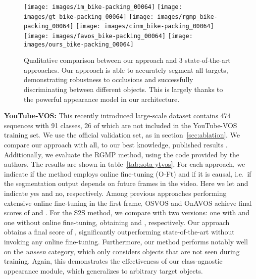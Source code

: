 \documentclass[10pt,twocolumn,letterpaper]{article}
\newcommand{\parsection}[1]{\noindent\textbf{#1:} }
\begin{document}
\begin{figure*}[!t]
  \texttt{[image: images/im\_bike-packing\_00064]}
  \texttt{[image: images/gt\_bike-packing\_00064]}
  \texttt{[image: images/rgmp\_bike-packing\_00064]}
  \texttt{[image: images/cinm\_bike-packing\_00064]}
  \texttt{[image: images/favos\_bike-packing\_00064]}
  \texttt{[image: images/ours\_bike-packing\_00064]}

  \caption{Qualitative comparison between our approach and 3 state-of-the-art approaches. Our approach is able to accurately segment all targets, demonstrating robustness to occlusions and successfully discriminating between different objects. This is largely thanks to the powerful appearance model in our architecture.}
  \vspace{-.22cm}

  \label{fig:qualitative-comparison}
\end{figure*}

\parsection{YouTube-VOS}
This recently introduced large-scale dataset contains 474 sequences with 91 classes, 26 of which are not included in the YouTube-VOS training set. We use the official validation set, as in section~\ref{sec:ablation}. We compare our approach with all, to our best knowledge, published results \cite{YTVOS}. Additionally, we evaluate the RGMP method, using the code provided by the authors. The results are shown in table~\ref{tab:sota-ytvos}. For each approach, we indicate if the method employs online fine-tuning (O-Ft) and if it is causal, i.e.\ if the segmentation output depends on future frames in the video. Here we let \yesmark and \nomark indicate yes and no, respectively. Among previous approaches performing extensive online fine-tuning in the first frame, OSVOS and OnAVOS achieve final scores of  and . For the S2S method, we compare with two versions: one with and one without online fine-tuning, obtaining  and , respectively.
Our approach obtains a final score of , significantly outperforming state-of-the-art without invoking any online fine-tuning. Furthermore, our method performs notably well on the \emph{unseen} category, which only considers objects that are not seen during training. Again, this demonstrates the effectiveness of our class-agnostic appearance module, which generalizes to arbitrary target objects.
\end{document}
